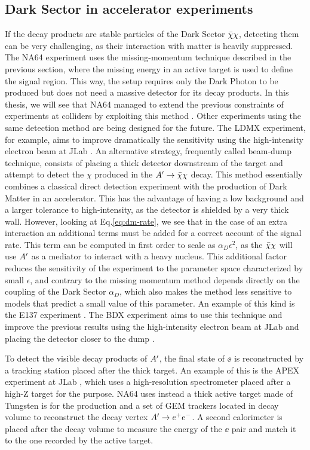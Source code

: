   \subsection{Dark Sector in accelerator experiments}

If the decay products are stable particles of the Dark Sector $\bar{\chi} \chi$, detecting them can be very challenging, as their interaction with matter is heavily suppressed. The NA64 experiment uses the missing-momentum technique described in the previous section, where the missing energy in an active target is used to define the signal region. This way, the setup requires only the Dark Photon to be produced but does not need a massive detector for its decay products. In this thesis, we will see that NA64 managed to extend the previous constraints of experiments at colliders by exploiting this method \cite{NA64:2019imj}. Other experiments using the same detection method are being designed for the future. The LDMX experiment, for example, aims to improve dramatically the sensitivity using the high-intensity electron beam at JLab \cite{Moreno:2019tfm}. An alternative strategy, frequently called beam-dump technique, consists of placing a thick detector downstream of the target and attempt to detect the $\chi$ produced in the $A' \to \bar{\chi} \chi$ decay. This method essentially combines a classical direct detection experiment with the production of Dark Matter in an accelerator. This has the advantage of having a low background and a larger tolerance to high-intensity, as the detector is shielded by a very thick wall. However, looking at Eq.\ref{eq:dm-rate}, we see that in the case of an extra interaction an additional terms must be added for a correct account of the signal rate. This term can be computed in first order to scale as $\alpha_D \epsilon^2$, as the $\bar{\chi} \chi$ will use $A'$ as a mediator to interact with a heavy nucleus. This additional factor reduces the sensitivity of the experiment to the parameter space characterized by small $\epsilon$, and contrary to the missing momentum method depends directly on the coupling of the Dark Sector $\alpha_D$, which also makes the method less sensitive to models that predict a small value of this parameter. An example of this kind is the E137 experiment \cite{e137}. The BDX experiment aims to use this technique and improve the previous results using the high-intensity electron beam at JLab and placing the detector closer to the dump \cite{Battaglieri:2019nok}.

To detect the visible decay products of $A'$, the final state of $\ee$ is reconstructed by a tracking station placed after the thick target. An example of this is the APEX experiment at JLab \cite{apex}, which uses a high-resolution spectrometer placed after a high-Z target for the purpose. NA64 uses instead a thick active target made of Tungsten is for the production and a set of GEM trackers located in decay volume to reconstruct the decay vertex $A' \to e^+e^-$. A second calorimeter is placed after the decay volume to measure the energy of the $\ee$ pair and match it to the one recorded by the active target.

